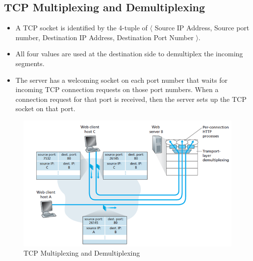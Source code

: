 \documentclass{article}
\theoremstyle{plain}
\theoremstyle{definition}
\begin{document}
\subsection{TCP Multiplexing and Demultiplexing}
\begin{itemize}
    \item A TCP socket is identified by the 4-tuple of $\langle$ Source IP Address, Source port number, Destination IP Address, Destination Port Number $\rangle$. 
    
    \item All four values are used at the destination side to demultiplex the incoming segments. 
    
    \item The server has a welcoming socket on each port number that waits for incoming TCP connection requests on those port numbers. When a connection request for that port is received, then the server sets up the TCP socket on that port. 
\end{itemize}

\begin{figure}
    \centering
    \includegraphics[scale=0.8]{cn1.png}
    \caption{TCP Multiplexing and Demultiplexing}
    \label{fig:my_label}
\end{figure}
\end{document}
